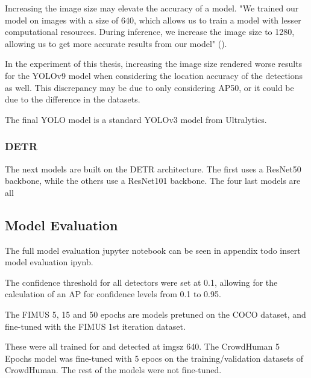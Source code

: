 \begin{myquote}
	{Increasing the image size may elevate the accuracy of a model.}
	"We trained our model on images with a size of 640, which allows us to train a model with lesser computational resources. During inference, we increase the image size to 1280, allowing us to get more accurate results from our model" (\cite{ga2024roboflow_custom_dataset}).
\end{myquote}

In the experiment of this thesis, increasing the image size rendered worse results for the YOLOv9 model when considering the location accuracy of the detections as well. This discrepancy may be due to \citeauthor{ga2024roboflow_custom_dataset} only considering AP50, or it could be due to the difference in the datasets.


The final YOLO model is a standard YOLOv3 model from Ultralytics.

\subsubsection{DETR}
The next models are built on the DETR architecture. The first uses a ResNet50 backbone, while the others use a ResNet101 backbone. The four last models are all 


\subsection{Model Evaluation}
The full model evaluation jupyter notebook can be seen in appendix todo insert model evaluation ipynb.

The confidence threshold for all detectors were set at 0.1, allowing for the calculation of an AP for confidence levels from 0.1 to 0.95. 

The FIMUS 5, 15 and 50 epochs are models pretuned on the COCO dataset, and fine-tuned with the FIMUS 1st iteration dataset. 

These were all trained for and detected at imgsz 640. The CrowdHuman 5 Epochs model was fine-tuned with 5 epocs on the training/validation datasets of CrowdHuman. The rest of the models were not fine-tuned.

